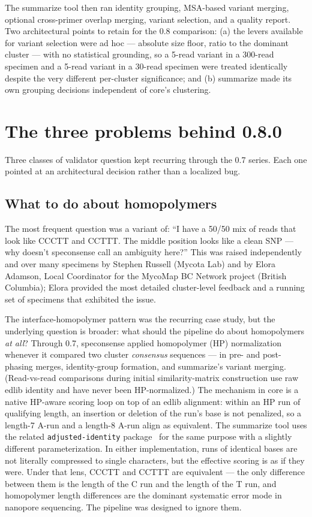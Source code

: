 \documentclass[11pt]{article}
\begin{document}
The summarize tool then ran identity grouping, MSA-based variant merging,
optional cross-primer overlap merging, variant selection, and a quality report.
Two architectural points to retain for the 0.8 comparison: (a) the levers
available for variant selection were ad hoc --- absolute size floor, ratio to
the dominant cluster --- with no statistical grounding, so a 5-read variant in
a 300-read specimen and a 5-read variant in a 30-read specimen were treated
identically despite the very different per-cluster significance; and (b)
summarize made its own grouping decisions independent of core's clustering.

\section{The three problems behind 0.8.0}
\label{sec:hp-and-ambiguity}

Three classes of validator question kept recurring through the 0.7 series.
Each one pointed at an architectural decision rather than a localized bug.

\subsection{What to do about homopolymers}

The most frequent question was a variant of: ``I have a 50/50 mix of reads
that look like CCCTT and CCTTT. The middle position looks like a clean SNP ---
why doesn't speconsense call an ambiguity here?'' This was raised
independently and over many specimens by Stephen Russell (Mycota Lab) and by
Elora Adamson, Local Coordinator for the MycoMap BC Network project (British
Columbia); Elora provided the most detailed cluster-level feedback and a
running set of specimens that exhibited the issue.

The interface-homopolymer pattern was the recurring case study, but the
underlying question is broader: what should the pipeline do about homopolymers
\emph{at all}? Through 0.7, speconsense applied homopolymer (HP)
normalization whenever it compared two cluster \emph{consensus} sequences
--- in pre- and post-phasing merges, identity-group formation, and
summarize's variant merging. (Read-vs-read comparisons during initial
similarity-matrix construction use raw edlib identity and have never been
HP-normalized.) The mechanism in core is a native HP-aware scoring loop
on top of an edlib alignment: within an HP run of qualifying length, an
insertion or deletion of the run's base is not penalized, so a length-7
A-run and a length-8 A-run align as equivalent. The summarize tool uses
the related \texttt{adjusted-identity} package~\cite{adjusted_identity}
for the same purpose with a slightly different parameterization. In
either implementation, runs of identical bases are not literally
compressed to single characters, but the effective scoring is as if they
were. Under that lens, CCCTT and CCTTT are equivalent --- the only
difference between them is the length of the C run and the length of
the T run, and homopolymer length differences are the dominant systematic
error mode in nanopore sequencing. The pipeline was designed to ignore them.
\end{document}
